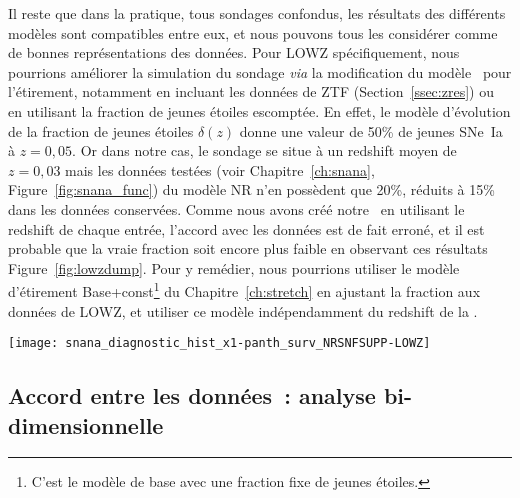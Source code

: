 \documentclass[../main/main.tex]{subfiles}
\begin{document}
Il reste que dans la pratique, tous sondages confondus, les résultats des
différents modèles sont compatibles entre eux, et nous pouvons tous les
considérer comme de bonnes représentations des données. Pour LOWZ
spécifiquement, nous pourrions améliorer la simulation du sondage \textit{via}
la modification du modèle~ pour l'étirement, notamment
en incluant les données de ZTF (Section~\ref{ssec:zres}) ou en utilisant la
fraction de jeunes étoiles escomptée. En effet, le modèle d'évolution de la
fraction de jeunes étoiles $\delta(z)$ donne une valeur de 50\% de jeunes SNe~Ia
à $z = 0,05$. Or dans notre cas, le sondage se situe à un redshift moyen de $z =
0,03$ mais les données testées (voir Chapitre~\ref{ch:snana},
Figure~\ref{fig:snana_func}) du modèle NR n'en possèdent que 20\%, réduits à
15\% dans les données conservées. Comme nous avons créé notre \hostlib\ en
utilisant le redshift de chaque entrée, l'accord avec les données est de fait
erroné, et il est probable que la vraie fraction soit encore plus faible en
observant ces résultats Figure~\ref{fig:lowzdump}. Pour y remédier, nous
pourrions utiliser le modèle d'étirement Base+const\footnote{C'est le modèle de
base avec une fraction fixe de jeunes étoiles.} du Chapitre~\ref{ch:stretch} en
ajustant la fraction aux données de LOWZ, et utiliser ce modèle indépendamment
du redshift de la \hostlib.

\begin{SCfigure}[1][ht]
    \centering
    \texttt{[image: snana\_diagnostic\_hist\_x1-panth\_surv\_NRSNFSUPP-LOWZ]}
    \caption[Histogrammes des données testées et conservées du modèle NR pour le
    sondage LOWZ]{Histogrammes des étirements des données de LOWZ~: \textit{en
        rouge} celles de Pantheon~; \textit{en violet} les données testées et
        \textit{en orange} les données conservées pour le modèle NR. Le
        modèle~ évalué aux fractions des jeunes SNe~Ia
        pour ces deux échantillons sont tracés en marqueurs de la couleur
        correspondante~; le modèle évalué au redshift moyen de la distribution
        est tracé en marqueurs noirs. Les parties vieilles des données testées
    et conservées sont en pointillés.}
    \label{fig:lowzdump}
\end{SCfigure}

\subsection{Accord entre les données~: analyse
bi-dimensionnelle}\label{ssec:comp2d}
\end{document}
